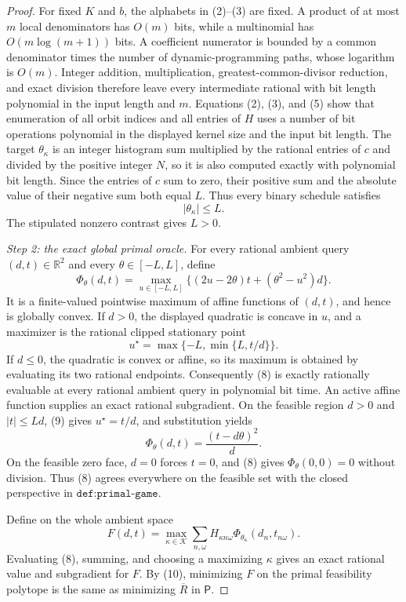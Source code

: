 \documentclass{article}
\begin{document}
\begin{proof}
For fixed \(K\) and \(b\), the alphabets in (2)--(3) are fixed.  A product of at most \(m\) local denominators has \(O(m)\) bits, while a multinomial has \(O(m\log(m+1))\) bits.  A coefficient numerator is bounded by a common denominator times the number of dynamic-programming paths, whose logarithm is \(O(m)\).  Integer addition, multiplication, greatest-common-divisor reduction, and exact division therefore leave every intermediate rational with bit length polynomial in the input length and \(m\).  Equations (2), (3), and (5) show that enumeration of all orbit indices and all entries of \(H\) uses a number of bit operations polynomial in the displayed kernel size and the input bit length.  The target \(\theta_\kappa\) is an integer histogram sum multiplied by the rational entries of \(c\) and divided by the positive integer \(N\), so it is also computed exactly with polynomial bit length.  Since the entries of \(c\) sum to zero, their positive sum and the absolute value of their negative sum both equal \(L\).  Thus every binary schedule satisfies
\[
 |\theta_\kappa|\le L.
\tag{7}
\]
The stipulated nonzero contrast gives \(L>0\).

\emph{Step 2: the exact global primal oracle.}
For every rational ambient query \((d,t)\in\mathbb R^2\) and every \(\theta\in[-L,L]\), define
\[
 \Phi_\theta(d,t)
 =\max_{u\in[-L,L]}
 \bigl\{(2u-2\theta)t+(\theta^2-u^2)d\bigr\}.
\tag{8}
\]
It is a finite-valued pointwise maximum of affine functions of \((d,t)\), and hence is globally convex.  If \(d>0\), the displayed quadratic is concave in \(u\), and a maximizer is the rational clipped stationary point
\[
 u^\star=\max\{-L,\min\{L,t/d\}\}.
\tag{9}
\]
If \(d\le0\), the quadratic is convex or affine, so its maximum is obtained by evaluating its two rational endpoints.  Consequently (8) is exactly rationally evaluable at every rational ambient query in polynomial bit time.  An active affine function supplies an exact rational subgradient.  On the feasible region \(d>0\) and \(|t|\le Ld\), (9) gives \(u^\star=t/d\), and substitution yields
\[
 \Phi_\theta(d,t)=\frac{(t-d\theta)^2}{d}.
\tag{10}
\]
On the feasible zero face, \(d=0\) forces \(t=0\), and (8) gives \(\Phi_\theta(0,0)=0\) without division.  Thus (8) agrees everywhere on the feasible set with the closed perspective in \(\texttt{def:primal-game}\).

Define on the whole ambient space
\[
 F(d,t)=\max_{\kappa\in\mathcal K}
 \sum_{n,\omega}H_{\kappa n\omega}
       \Phi_{\theta_\kappa}(d_n,t_{n\omega}).
\tag{11}
\]
Evaluating (8), summing, and choosing a maximizing \(\kappa\) gives an exact rational value and subgradient for \(F\).  By (10), minimizing \(F\) on the primal feasibility polytope is the same as minimizing \(\overline R\) in \(\mathsf P\).


\end{proof}
\end{document}
